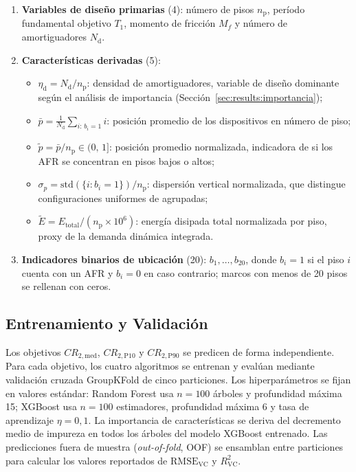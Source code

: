 \documentclass[preprint,12pt,authoryear]{elsarticle}
\newcommand{\CR}[1]{CR_{2,\text{#1}}}
\newcommand{\RMSE}{\mathrm{RMSE_{VC}}}       %
\newcommand{\Rsq}{R^{2}_{\mathrm{VC}}}
\newcommand{\nd}{N_{\mathrm{d}}}
\newcommand{\np}{n_{\mathrm{p}}}              %
\newcommand{\etad}{\eta_{\mathrm{d}}}
\newcommand{\Mf}{M_{\!f}}
\begin{document}
\begin{enumerate}[label=\textit{\roman*})]
    \item \textbf{Variables de diseño primarias} (4):
          número de pisos $\np$, período fundamental objetivo $T_1$,
          momento de fricción $\Mf$ y número de amortiguadores $\nd$.

    \item \textbf{Características derivadas} (5):
    \begin{itemize}
        \item $\etad = \nd/\np$: densidad de amortiguadores, variable de
              diseño dominante según el análisis de importancia
              (Sección~\ref{sec:results:importancia});
        \item $\bar{p} = \tfrac{1}{\nd}\sum_{i:\,b_i=1} i$: posición
              promedio de los dispositivos en número de piso;
        \item $\tilde{p} = \bar{p}/\np \in (0,\,1]$: posición promedio
              normalizada, indicadora de si los AFR se concentran en pisos
              bajos o altos;
        \item $\sigma_p = \mathrm{std}\!\left(\{i:b_i=1\}\right)/\np$:
              dispersión vertical normalizada, que distingue configuraciones
              uniformes de agrupadas;
        \item $\tilde{E} = E_{\mathrm{total}}/(\np\times10^6)$: energía
              disipada total normalizada por piso, proxy de la demanda
              dinámica integrada.
    \end{itemize}

    \item \textbf{Indicadores binarios de ubicación} (20):
          $b_1,\ldots,b_{20}$, donde $b_i=1$ si el piso $i$ cuenta con
          un AFR y $b_i=0$ en caso contrario; marcos con menos de 20 pisos
          se rellenan con ceros.
\end{enumerate}

\subsection{Entrenamiento y Validación}
\label{sec:method:entrenamiento}

Los objetivos $\CR{med}$, $\CR{P10}$ y $\CR{P90}$ se predicen de forma
independiente. Para cada objetivo, los cuatro algoritmos se entrenan y evalúan
mediante validación cruzada GroupKFold de cinco particiones. Los
hiperparámetros se fijan en valores estándar: Random Forest usa $n=100$ árboles
y profundidad máxima 15; XGBoost usa $n=100$ estimadores, profundidad máxima 6
y tasa de aprendizaje $\eta=0{,}1$. La importancia de características se deriva
del decremento medio de impureza en todos los árboles del modelo XGBoost
entrenado. Las predicciones fuera de muestra (\textit{out-of-fold}, OOF) se
ensamblan entre particiones para calcular los valores reportados de $\RMSE$ y
$\Rsq$.
\end{document}
